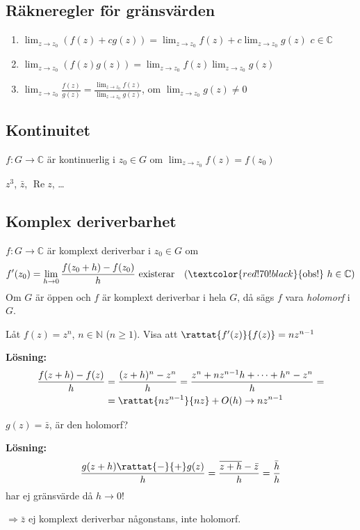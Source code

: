 \subsection{Räkneregler för gränsvärden}
\begin{enumerate}[label=\alph*)]
  \item $\displaystyle\lim_{z \to z_0} (f(z) + cg(z)) = \lim_{z \to z_0} f(z) + c \lim_{z \to z_0} g(z)$ \quad \textcolor{blue!60!black}{$c \in \mathbb{C}$}
  \item $\displaystyle\lim_{z \to z_0} (f(z)g(z)) = \lim_{z \to z_0} f(z) \lim_{z \to z_0} g(z)$
  \item $\displaystyle\lim_{z \to z_0} \frac{f(z)}{g(z)} = \frac{\lim_{z \to z_0} f(z)}{\lim_{z \to z_0} g(z)}$, \quad om $\displaystyle\lim_{z \to z_0} g(z) \neq 0$
\end{enumerate}

\subsection{Kontinuitet}
\begin{definition}
$f : G \to \mathbb{C}$ är kontinuerlig i $z_0 \in G$ om $\displaystyle\lim_{z \to z_0} f(z) = f(z_0)$
\end{definition}

\begin{example}
$z^3$, $\bar{z}$, $\operatorname{Re} z$, \dots
\end{example}

\subsection{Komplex deriverbarhet}
\begin{definition}
$f : G \to \mathbb{C}$ är komplext deriverbar i $z_0 \in G$ om
\[ f'(z_0) = \lim_{h \to 0} \frac{f(z_0 + h) - f(z_0)}{h} \text{ existerar} \quad (\textcolor{red!70!black}{\text{obs!}}\ h \in \mathbb{C}) \]
Om $G$ är öppen och $f$ är komplext deriverbar i hela $G$, då sägs $f$ vara \emph{holomorf} i $G$.
\end{definition}

\begin{example}
Låt $f(z) = z^n$, $n \in \mathbb{N}$ ($n \ge 1$). Visa att $\rattat{f'(z)}{f(z)} = nz^{n-1}$

\textbf{Lösning:}
\begin{align*}
  \frac{f(z+h) - f(z)}{h} &= \frac{(z+h)^n - z^n}{h} = \frac{z^n + nz^{n-1}h + \dots + h^n - z^n}{h} = \\
  &= \rattat{nz^{n-1}}{nz} + O(h) \to nz^{n-1}
\end{align*}
\end{example}

\begin{example}
$g(z) = \bar{z}$, är den holomorf?

\textbf{Lösning:}
\[ \frac{g(z+h) \rattat{-}{+} g(z)}{h} = \frac{\overline{z+h} - \bar{z}}{h} = \frac{\bar{h}}{h} \]
\textcolor{red!70!black}{har ej gränsvärde då $h \to 0$!}

\textcolor{red!70!black}{$\Rightarrow \bar{z}$ ej komplext deriverbar någonstans, inte holomorf.}
\end{example}
